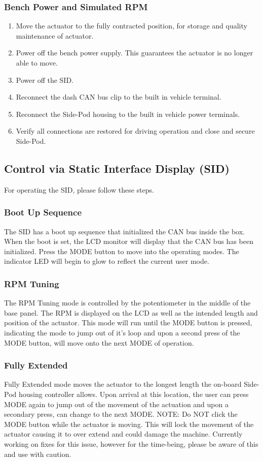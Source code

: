 \documentclass{article}
\begin{document}
\subsubsection{Bench Power and Simulated RPM}
\begin{enumerate}
    \item Move the actuator to the fully contracted position, for storage and quality maintenance of actuator.
    \item Power off the bench power supply. This guarantees the actuator is no longer able to move.
    \item Power off the SID.
    \item Reconnect the dash CAN bus clip to the built in vehicle terminal.
    \item Reconnect the Side-Pod housing to the built in vehicle power terminals.
    \item Verify all connections are restored for driving operation and close and secure Side-Pod.
\end{enumerate}

\subsection{Control via Static Interface Display (SID)}
For operating the SID, please follow these steps.
\subsubsection{Boot Up Sequence}
The SID has a boot up sequence that initialized the CAN bus inside the box. When the boot is set, the LCD monitor will display that the CAN bus has been initialized. Press the MODE button to move into the operating modes. The indicator LED will begin to glow to reflect the current user mode.
\subsubsection{RPM Tuning}
The RPM Tuning mode is controlled by the potentiometer in the middle of the base panel. The RPM is displayed on the LCD as well as the intended length and position of the actuator. This mode will run until the MODE button is pressed, indicating the mode to jump out of it's loop and upon a second press of the MODE button, will move onto the next MODE of operation.
\subsubsection{Fully Extended}
Fully Extended mode moves the actuator to the longest length the on-board Side-Pod housing controller allows. Upon arrival at this location, the user can press MODE again to jump out of the movement of the actuation and upon a secondary press, can change to the next MODE.
\newline \newline
NOTE: Do NOT click the MODE button while the actuator is moving. This will lock the movement of the actuator causing it to over extend and could damage the machine. Currently working on fixes for this issue, however for the time-being, please be aware of this and use with caution.
\end{document}
